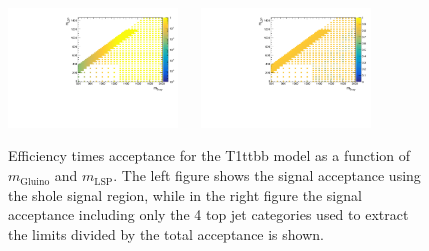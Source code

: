 \begin{figure}[h!]
  \begin{center}
    \includegraphics[width=0.4\textwidth]{figures/jetRanking/T1ttbb/eff/T1ttbb_merging_9_cats.pdf} ~~
    \includegraphics[width=0.4\textwidth]{figures/susyResults/T1ttbb_doubleRatioAcceptance.pdf} \\
    \caption{
      Efficiency times acceptance for the T1ttbb model as a function of $m_{\mathrm{Gluino}}$ and $m_{\mathrm{LSP}}$.
      The left figure shows the signal acceptance using the shole signal region, 
      while in the right figure the signal acceptance including only the 4 top jet categories used to extract the limits divided by the total acceptance is shown.
    }
    \label{fig:sig-eff-T1ttbb}
  \end{center}
\end{figure}

